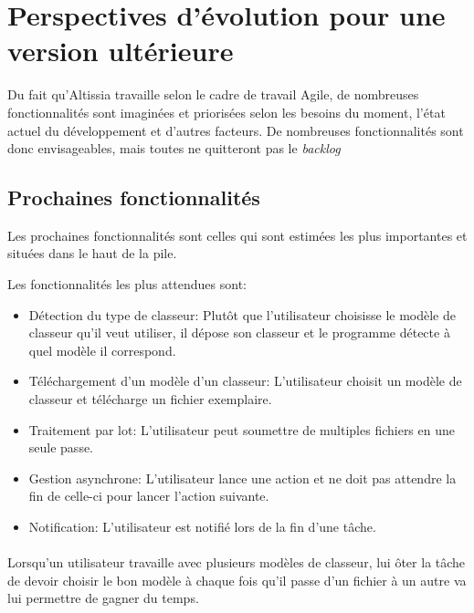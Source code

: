 \section{Perspectives d'évolution pour une version ultérieure}
\label{sec:future-release-outlook}

Du fait qu’Altissia travaille selon le cadre de travail Agile, de nombreuses fonctionnalités sont imaginées et priorisées selon les besoins du moment, l'état actuel du développement et d'autres facteurs.
De nombreuses fonctionnalités sont donc envisageables, mais toutes ne quitteront pas le \textit{backlog}\fnmark
{}

\subsection{Prochaines fonctionnalités}
\label{subsec:next-features}

Les prochaines fonctionnalités sont celles qui sont estimées les plus importantes et situées dans le haut de la pile.

Les fonctionnalités les plus attendues sont:
\begin{itemize}
    \item Détection du type de classeur: Plutôt que l'utilisateur choisisse le modèle de classeur qu'il veut utiliser, il dépose son classeur et le programme détecte à quel modèle il correspond.
    \item Téléchargement d'un modèle d'un classeur: L'utilisateur choisit un modèle de classeur et télécharge un fichier exemplaire.
    \item Traitement par lot: L'utilisateur peut soumettre de multiples fichiers en une seule passe.
    \item Gestion asynchrone: L'utilisateur lance une action et ne doit pas attendre la fin de celle-ci pour lancer l'action suivante.
    \item Notification: L'utilisateur est notifié lors de la fin d'une tâche.
\end{itemize}

\paragraph{}
Lorsqu'un utilisateur travaille avec plusieurs modèles de classeur, lui ôter la tâche de devoir choisir le bon modèle à chaque fois qu'il passe d'un fichier à un autre va lui permettre de gagner du temps.

